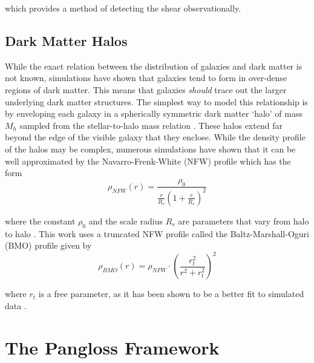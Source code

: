 \documentclass[%
 reprint,
 amsmath,amssymb,
 aps,nofootinbib
]{revtex4-1}
\begin{document}
 \noindent which provides a method of detecting the shear observationally.

\subsection*{Dark Matter Halos}

While the exact relation between the distribution of galaxies and dark matter is not known, simulations have shown that galaxies tend to form in over-dense regions of dark matter. This means that galaxies \textit{should} trace out the larger underlying dark matter structures. The simplest way to model this relationship is by enveloping each galaxy in a spherically symmetric dark matter `halo' of mass $M_h$ sampled from the stellar-to-halo mass relation \cite{smhr}. These halos extend far beyond the edge of the visible galaxy that they enclose. While the density profile of the halos may be complex, numerous simulations have shown that it can be well approximated by the Navarro-Frenk-White (NFW) profile which has the form
\begin{equation}\label{nfw_profile}
\rho_{NFW}(r)=\frac{\rho_0}{\frac{r}{R_s}\left(1+\frac{r}{R_s}\right)^2}
\end{equation}

\noindent where the constant $\rho_0$ and the scale radius $R_s$ are parameters that vary from halo to halo \cite{nfw}. This work uses a truncated NFW profile called the Baltz-Marshall-Oguri (BMO) profile given by
\begin{equation}\label{bmo_profile}
\rho_{BMO}(r)=\rho_{NFW}\cdot\left(\frac{r_t^2}{r^2+r_t^2}\right)^2
\end{equation}

\noindent where $r_t$ is a free parameter, as it has been shown to be a better fit to simulated data \cite{nfw_bmo}.

\section{The Pangloss Framework}
\end{document}
